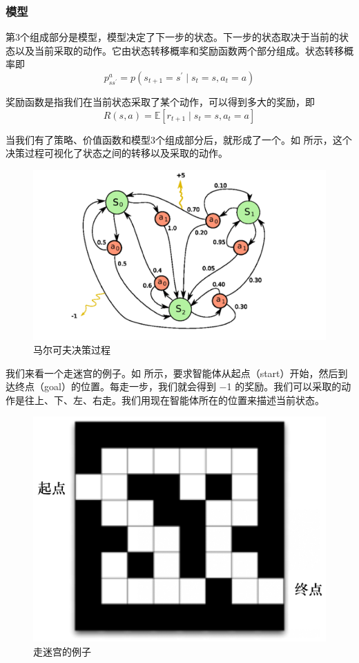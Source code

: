 \subsubsection{模型} 
第3个组成部分是模型，模型决定了下一步的状态。下一步的状态取决于当前的状态以及当前采取的动作。它由状态转移概率和奖励函数两个部分组成。状态转移概率即
\begin{equation}
p_{s s^{\prime}}^{a}=p\left(s_{t+1}=s^{\prime} \mid s_{t}=s, a_{t}=a\right)
\label{eq:model_1}    
\end{equation}

奖励函数是指我们在当前状态采取了某个动作，可以得到多大的奖励，即
\begin{equation}
R(s,a)=\mathbb{E}\left[r_{t+1} \mid s_{t}=s, a_{t}=a\right]
\label{eq:model_2}    
\end{equation}

当我们有了策略、价值函数和模型3个组成部分后，就形成了一个。如 所示，这个决策过程可视化了状态之间的转移以及采取的动作。

\begin{figure}[htb]
    \centering
    \includegraphics[width=0.5\linewidth]{res/ch1/1.29}
    \caption{马尔可夫决策过程}
    \label{fig:MDP_vis}
\end{figure}


我们来看一个走迷宫的例子。如 所示，要求智能体从起点（start）开始，然后到达终点（goal）的位置。每走一步，我们就会得到 $-$1 的奖励。我们可以采取的动作是往上、下、左、右走。我们用现在智能体所在的位置来描述当前状态。

\begin{figure}[htb]
    \centering
    \includegraphics[width=0.3\linewidth]{res/ch1/1.30}
    \caption{走迷宫的例子}
    \label{fig:maze_example}
\end{figure}


